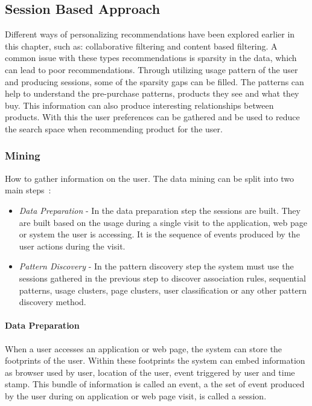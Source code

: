 \subsection{Session Based Approach}
    Different ways of personalizing recommendations have been explored earlier in this chapter, such as: collaborative filtering and content based filtering.
    A common issue with these types recommendations is sparsity in the data, which can lead to poor recommendations.
    Through utilizing usage pattern of the user and producing sessions, some of the sparsity gaps can be filled.
    The patterns can help to understand the pre-purchase patterns, products they see and what they buy.
    This information can also produce interesting relationships between products.
    With this the user preferences can be gathered and be used to reduce the search space when recommending product for the user.


\subsubsection{Mining}
    How to gather information on the user.
    The data mining can be split into two main steps~\cite{Cho2002329}:
    \begin{itemize}
        \item \emph{Data Preparation} - In the data preparation step the sessions are built. They are built based on the usage during a single visit to the application, web page or system the user is accessing. It is the sequence of events produced by the user actions during the visit.
        \item \emph{Pattern Discovery} - In the pattern discovery step the system must use the sessions gathered in the previous step to discover association rules, sequential patterns, usage clusters, page clusters, user classification or any other pattern discovery method.
    \end{itemize}


    \paragraph{Data Preparation} %
        \label{par:Data_Preparation}
        When a user accesses an application or web page, the system can store the footprints of the user.
        Within these footprints the system can embed information as browser used by user, location of the user, event triggered by user and time stamp.
        This bundle of information is called an event, a the set of event produced by the user during on application or web page visit, is called a session.

